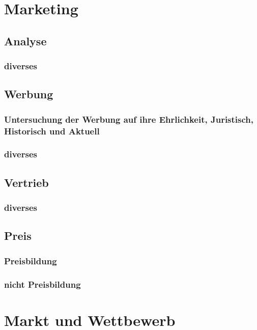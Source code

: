 \chapter{Marketing}
\section{Analyse}
\subsection{diverses}

\section{Werbung}
\subsection{Untersuchung der Werbung auf ihre Ehrlichkeit, Juristisch, Historisch und Aktuell}

\subsection{diverses}

\section{Vertrieb}
\subsection{diverses}

\section{Preis}
\subsection{Preisbildung}

\subsection{nicht Preisbildung}

\chapter{Markt und Wettbewerb}
